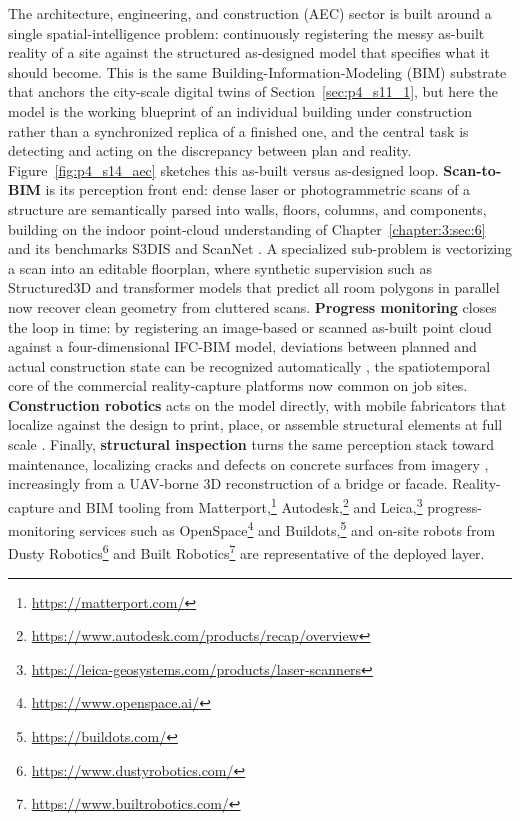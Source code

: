 The architecture, engineering, and construction (AEC) sector is built around a single spatial-intelligence problem: continuously registering the messy as-built reality of a site against the structured as-designed model that specifies what it should become. 
This is the same Building-Information-Modeling (BIM) substrate that anchors the city-scale digital twins of Section~\ref{sec:p4_s11_1}, but here the model is the working blueprint of an individual building under construction rather than a synchronized replica of a finished one, and the central task is detecting and acting on the discrepancy between plan and reality.
Figure~\ref{fig:p4_s14_aec} sketches this as-built versus as-designed loop. \textbf{Scan-to-BIM} is its perception front end: dense laser or photogrammetric scans of a structure are semantically parsed into walls, floors, columns, and components, building on the indoor point-cloud understanding of Chapter~\ref{chapter:3:sec:6} and its benchmarks S3DIS \cite{armeni2016s3dis} and ScanNet \cite{dai2017scannet}. 
A specialized sub-problem is vectorizing a scan into an editable floorplan, where synthetic supervision such as Structured3D \cite{zheng2020structured3d} and transformer models that predict all room polygons in parallel \cite{yue2023roomformer} now recover clean geometry from cluttered scans. 
\textbf{Progress monitoring} closes the loop in time: by registering an image-based or scanned as-built point cloud against a four-dimensional IFC-BIM model, deviations between planned and actual construction state can be recognized automatically \cite{golparvarfard2015automated}, the spatiotemporal core of the commercial reality-capture platforms now common on job sites. 
\textbf{Construction robotics} acts on the model directly, with mobile fabricators that localize against the design to print, place, or assemble structural elements at full scale \cite{giftthaler2017mobile}. 
Finally, \textbf{structural inspection} turns the same perception stack toward maintenance, localizing cracks and defects on concrete surfaces from imagery \cite{cha2017deep}, increasingly from a UAV-borne 3D reconstruction of a bridge or facade. Reality-capture and BIM tooling from Matterport,\footnote{\url{https://matterport.com/}} Autodesk,\footnote{\url{https://www.autodesk.com/products/recap/overview}} and Leica,\footnote{\url{https://leica-geosystems.com/products/laser-scanners}} progress-monitoring services such as OpenSpace\footnote{\url{https://www.openspace.ai/}} and Buildots,\footnote{\url{https://buildots.com/}} and on-site robots from Dusty Robotics\footnote{\url{https://www.dustyrobotics.com/}} and Built Robotics\footnote{\url{https://www.builtrobotics.com/}} are representative of the deployed layer.

